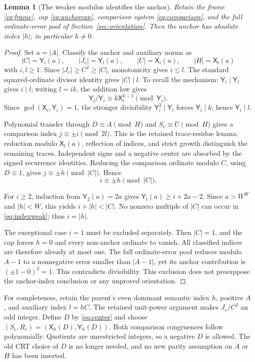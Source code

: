 \documentclass[11pt,letterpaper]{article}
\newtheorem{lemma}[theorem]{Lemma}
\theoremstyle{definition}\newtheorem{definition}[theorem]{Definition}
\theoremstyle{remark}\newtheorem{remark}[theorem]{Remark}
\newcommand{\X}{\mathsf X}
\newcommand{\Y}{\mathsf Y}
\begin{document}
\begin{lemma}[The weaker modulus identifies the anchor]\label{lem:anchor}
Retain the frame \eqref{eq:frame}, cap \eqref{eq:anchorcap}, comparison system \eqref{eq:comparison}, and the full ordinate-error pool of Section~\ref{sec:orientation}. Then the anchor has absolute index \(|h|\); in particular \(h\ne0\).
\end{lemma}
\begin{proof}
Set \(a=|A|\). Classify the anchor and auxiliary norms as
\[
 |C|=\Y_i(a),\qquad |J_c|=\Y_l(a),\qquad |U|=\X_i(a),\qquad|H|=\X_l(a)
\]
with \(i,l\ge1\). Since \(|J_c|\ge C^2\ge|C|\), monotonicity gives \(i\le l\). The standard squared-ordinate divisor identity gives \(|C|\mid l\). To recall the mechanism: \(\Y_i\mid\Y_l\) gives \(i\mid l\); writing \(l=ik\), the addition law gives
\[
 \Y_l/\Y_i\equiv k\X_i^{k-1}\pmod{\Y_i}.
\]
Since \(\gcd(\X_i,\Y_i)=1\), the stronger divisibility \(\Y_i^2\mid\Y_l\) forces \(\Y_i\mid k\), hence \(\Y_i\mid l\).

Polynomial transfer through \(D\equiv A\pmod H\) and \(S_c\equiv U\pmod H\) gives a comparison index \(j\equiv\pm i\pmod{2l}\). This is the retained trace-residue lemma: reduction modulo \(\X_l(a)\), reflection of indices, and strict growth distinguish the remaining traces. Independent signs and a negative center are absorbed by the signed recurrence identities. Reducing the comparison ordinate modulo \(C\), using \(D\equiv1\), gives \(j\equiv\pm h\pmod{|C|}\). Hence
\begin{equation}\label{eq:indexweak}
 i\equiv\pm h\pmod{|C|}.
\end{equation}

For \(i\ge2\), induction from \(\Y_2(a)=2a\) gives
\(\Y_i(a)\ge i+2a-2\). Since \(a>W^W\) and \(|h|<W\), this yields
\(i+|h|<|C|\). No nonzero multiple of \(|C|\) can occur in \eqref{eq:indexweak}; thus \(i=|h|\).

The exceptional case \(i=1\) must be excluded separately. Then \(|C|=1\), and the cap forces \(h=0\) and every non-anchor ordinate to vanish. All classified indices are therefore already at most one. The full ordinate-error pool reduces modulo \(A-1\) to a nonnegative error smaller than \(|A-1|\), yet its anchor contribution is \((\pm1-0)^2=1\). This contradicts divisibility. This exclusion does not presuppose the anchor-index conclusion or any unproved orientation.
\end{proof}

For completeness, retain the parent's even dominant semantic index \(h\), positive \(A\), and auxiliary index \(l=hC\). The retained unit-power argument makes \(J_c/C^2\) an odd integer. Define \(D\) by \eqref{eq:center} and choose \((S_c,R_c)=(\X_h(D),\Y_h(D))\). Both comparison congruences follow polynomially. Quotients are unrestricted integers, so a negative \(D\) is allowed. The old CRT choice of \(D\) is no longer needed, and no new parity assumption on \(A\) or \(H\) has been inserted.
\end{document}
